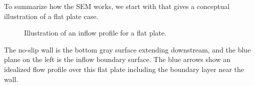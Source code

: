 
\label{SEC:SEM:theory:VirtualBox}

To summarize how the SEM works, we start with  that
gives a conceptual illustration of a flat plate case.
%
\begin{figure}[tb]
  \centering
  \caption{Illustration of an inflow profile for a flat plate.}
  \label{FIG:SEM:FlatPlate}
\end{figure}
%
The no-slip wall is the bottom gray surface extending downstream,
and the blue plane on the left is the inflow boundary surface.
%
The blue arrows show an idealized flow profile over this flat plate including
the boundary layer near the wall.


